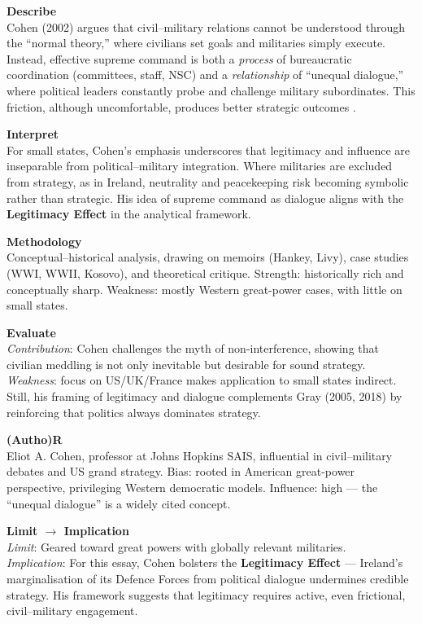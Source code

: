 \textbf{Describe} \\
Cohen (2002) argues that civil--military relations cannot be understood through the ``normal theory,'' where civilians set goals and militaries simply execute. Instead, effective supreme command is both a \textit{process} of bureaucratic coordination (committees, staff, NSC) and a \textit{relationship} of ``unequal dialogue,'' where political leaders constantly probe and challenge military subordinates. This friction, although uncomfortable, produces better strategic outcomes \parencite{COHEN_2002}.

\textbf{Interpret} \\
For small states, Cohen’s emphasis underscores that legitimacy and influence are inseparable from political--military integration. Where militaries are excluded from strategy, as in Ireland, neutrality and peacekeeping risk becoming symbolic rather than strategic. His idea of supreme command as dialogue aligns with the \textbf{Legitimacy Effect} in the analytical framework.

\textbf{Methodology} \\
Conceptual--historical analysis, drawing on memoirs (Hankey, Livy), case studies (WWI, WWII, Kosovo), and theoretical critique. Strength: historically rich and conceptually sharp. Weakness: mostly Western great-power cases, with little on small states.

\textbf{Evaluate} \\
\textit{Contribution}: Cohen challenges the myth of non-interference, showing that civilian meddling is not only inevitable but desirable for sound strategy. \\
\textit{Weakness}: focus on US/UK/France makes application to small states indirect. Still, his framing of legitimacy and dialogue complements Gray (2005, 2018) by reinforcing that politics always dominates strategy.

\textbf{(Autho)R} \\
Eliot A. Cohen, professor at Johns Hopkins SAIS, influential in civil--military debates and US grand strategy. Bias: rooted in American great-power perspective, privileging Western democratic models. Influence: high --- the ``unequal dialogue'' is a widely cited concept.

\textbf{Limit $\rightarrow$ Implication} \\
\textit{Limit}: Geared toward great powers with globally relevant militaries. \\
\textit{Implication}: For this essay, Cohen bolsters the \textbf{Legitimacy Effect} --- Ireland’s marginalisation of its Defence Forces from political dialogue undermines credible strategy. His framework suggests that legitimacy requires active, even frictional, civil--military engagement.

